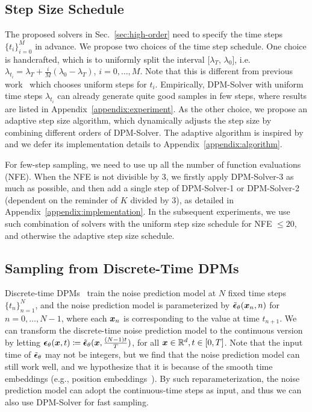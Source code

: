 \subsection{Step Size Schedule}
\label{sec:adaptive}
The proposed solvers in Sec.~\ref{sec:high-order} need to specify the time steps $\{t_i\}_{i=0}^M$ in advance. We propose two choices of the time step schedule. One choice is handcrafted, which is to uniformly split the interval $[\lambda_T$, $\lambda_0$], i.e.
$\lambda_{t_i} = \lambda_T + \frac{i}{M}(\lambda_0 - \lambda_T)$, $i=0,\dots,M$. 
Note that this is different from previous work~\citep{ho2020denoising,song2020score} which chooses uniform steps for $t_i$.
Empirically, DPM-Solver with uniform time steps $\lambda_{t_i}$ can already generate quite good samples in few steps, where results are listed in Appendix~\ref{appendix:experiment}.
As the other choice, we propose an adaptive step size algorithm, which dynamically adjusts the step size by combining different orders of DPM-Solver. The adaptive algorithm is inspired by~\citep{jolicoeur2021gotta} and we defer its implementation details to Appendix~\ref{appendix:algorithm}.

For few-step sampling, we need to use up all the number of function evaluations (NFE). When the NFE is not divisible by $3$, we firstly apply DPM-Solver-3 as much as possible, and then add a single step of DPM-Solver-1 or DPM-Solver-2 (dependent on the reminder of $K$ divided by $3$), as detailed in Appendix~\ref{appendix:implementation}. In the subsequent experiments, we use such combination of solvers with the uniform step size schedule for NFE $\leq 20$, and otherwise the adaptive step size schedule.









\subsection{Sampling from Discrete-Time DPMs}
\label{sec:discrete-time}
Discrete-time DPMs~\citep{ho2020denoising} train the noise prediction model at $N$ fixed time steps $\{t_n\}_{n=1}^N$, and the noise prediction model is parameterized by $\tilde{\bm{\epsilon}}_\theta(\bm{x}_n, n)$ for $n=0,\dots,N-1$, where each $\bm{x}_n$ is corresponding to the value at time $t_{n+1}$. We can transform the discrete-time noise prediction model to the continuous version by letting
$\bm{\epsilon}_\theta(\bm{x}, t)\coloneqq \tilde{\bm{\epsilon}}_\theta(\bm{x}, \frac{(N-1)t}{T})$, for all $\bm{x}\in\mathbb{R}^d, t\in[0,T]$.
Note that the input time of $\tilde{\bm{\epsilon}}_\theta$ may not be integers, but we find that the noise prediction model can still work well, and we hypothesize that it is because of the smooth time embeddings (e.g., position embeddings~\citep{ho2020denoising}). By such reparameterization, the noise prediction model can adopt the continuous-time steps as input, and thus we can also use DPM-Solver for fast sampling.